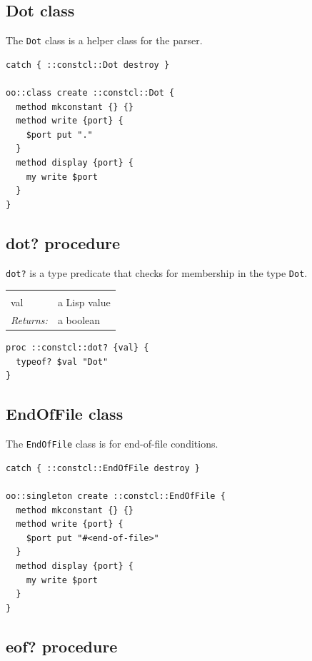 \documentclass[twoside,9pt]{report}
\begin{document}
\subsection{Dot class}
\label{dot-class}


The \texttt{Dot} class is a helper class for the parser.

\begin{lstlisting}
catch { ::constcl::Dot destroy }

oo::class create ::constcl::Dot {
  method mkconstant {} {}
  method write {port} {
    $port put "."
  }
  method display {port} {
    my write $port
  }
}
\end{lstlisting}
\subsection{dot? procedure}
\label{dot?-procedure}


\texttt{dot?} is a type predicate that checks for membership in the type \texttt{Dot}.

\noindent\begin{tabular}{ |p{1.9cm} p{8cm}| }
\hline
\rowcolor[HTML]{CCCCCC} \multicolumn{2}{|l|}{\bf dot? (internal)} \\
val & a Lisp value \\
\textit{Returns:} & a boolean \\
\hline
\end{tabular}
\begin{lstlisting}
proc ::constcl::dot? {val} {
  typeof? $val "Dot"
}
\end{lstlisting}
\subsection{EndOfFile class}
\label{endoffile-class}


The \texttt{EndOfFile} class is for end-of-file conditions.

\begin{lstlisting}
catch { ::constcl::EndOfFile destroy }

oo::singleton create ::constcl::EndOfFile {
  method mkconstant {} {}
  method write {port} {
    $port put "#<end-of-file>"
  }
  method display {port} {
    my write $port
  }
}
\end{lstlisting}
\subsection{eof? procedure}
\label{eof?-procedure}
\end{document}
